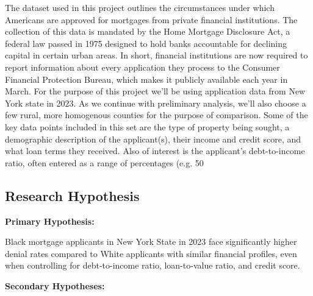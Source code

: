 \documentclass[manuscript,authorversion,nonacm]{acmart} %
\begin{document}
The dataset used in this project outlines the circumstances under which Americans are approved for mortgages from private financial institutions. The collection of this data is mandated by the Home Mortgage Disclosure Act, a federal law passed in 1975 designed to hold banks accountable for declining capital in certain urban areas. In short, financial institutions are now required to report information about every application they process to the Consumer Financial Protection Bureau, which makes it publicly available each year in March. For the purpose of this project we'll be using application data from New York state in 2023. As we continue with preliminary analysis, we'll also choose a few rural, more homogenous counties for the purpose of comparison. Some of the key data points included in this set are the type of property being sought, a demographic description of the applicant(s), their income and credit score, and what loan terms they received. Also of interest is the applicant’s debt-to-income ratio, often entered as a range of percentages (e.g. 50%

\subsection{Research Hypothesis} 

\textbf{Primary Hypothesis:} 

Black mortgage applicants in New York State in 2023 face significantly higher denial rates compared to White applicants with similar financial profiles, even when controlling for debt-to-income ratio, loan-to-value ratio, and credit score.

\textbf{Secondary Hypotheses:}
\end{document}

